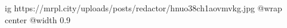 
 
 
 
 

\ifcmt
  ig https://mrpl.city/uploads/posts/redactor/hnuo38ch1aovmvkg.jpg
  @wrap center
  @width 0.9
\fi
